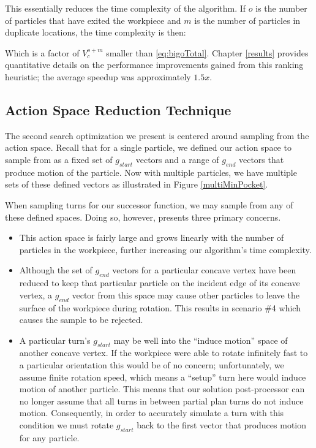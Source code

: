 This essentially reduces the time complexity of the algorithm. If $o$ is the number of particles that have exited the workpiece and $m$ is the number of particles in duplicate locations, the time complexity is then:

 {
  \label{eq:bigoTotalWithHeuristic}
}

Which is a factor of $V_{c}^{o + m}$ smaller than \eqref{eq:bigoTotal}. Chapter \ref{results} provides quantitative details on the performance improvements gained from this ranking heuristic; the average speedup was approximately $1.5x$.

\subsection{Action Space Reduction Technique}

The second search optimization we present is centered around sampling from the action space. Recall that for a single particle, we defined our action space to sample from as a fixed set of $g_{start}$ vectors and a range of $g_{end}$ vectors that produce motion of the particle. Now with multiple particles, we have multiple sets of these defined vectors as illustrated in Figure \ref{multiMinPocket}.


When sampling turns for our successor function, we may sample from any of these defined spaces. Doing so, however, presents three primary concerns.

\begin{itemize}
\item This action space is fairly large and grows linearly with the number of particles in the workpiece, further increasing our algorithm's time complexity.
\item Although the set of $g_{end}$ vectors for a particular concave vertex have been reduced to keep that particular particle on the incident edge of its concave vertex, a $g_{end}$ vector from this space may cause other particles to leave the surface of the workpiece during rotation. This results in scenario \#4 which causes the sample to be rejected.
\item A particular turn's $g_{start}$ may be well into the ``induce motion'' space of another concave vertex. If the workpiece were able to rotate infinitely fast to a particular orientation this would be of no concern; unfortunately, we assume finite rotation speed, which means a ``setup'' turn here would induce motion of another particle. This means that our solution post-processor can no longer assume that all turns in between partial plan turns do not induce motion. Consequently, in order to accurately simulate a turn with this condition we must rotate $g_{start}$ back to the first vector that produces motion for any particle.
\end{itemize}


